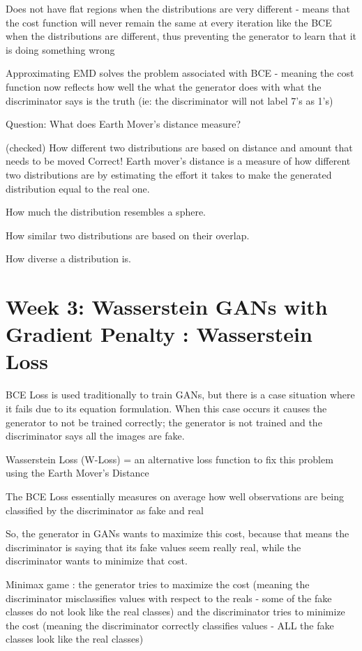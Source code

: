 \documentclass[11pt, onecolumn]{article}
\begin{document}
Does not have flat regions when the distributions are very different - means that the cost function will never remain the same at every iteration like the BCE when the distributions are different, thus preventing the generator to learn that it is doing something wrong

Approximating EMD solves the problem associated with BCE - meaning the cost function now reflects how well the what the generator does with what the discriminator says is the truth (ie: the discriminator will not label 7's as 1's) 

Question: 
What does Earth Mover's distance measure?

(checked) How different two distributions are based on distance and amount that needs to be moved
Correct! Earth mover's distance is a measure of how different two distributions are by estimating the effort it takes to make the generated distribution equal to the real one.

How much the distribution resembles a sphere.

How similar two distributions are based on their overlap.

How diverse a distribution is.

\section{Week 3: Wasserstein GANs with Gradient Penalty : Wasserstein Loss}

BCE Loss is used traditionally to train GANs, but there is a case situation where it fails due to its equation formulation. When this case occurs it causes the generator to not be trained correctly; the generator is not trained and the discriminator says all the images are fake.

Wasserstein Loss (W-Loss) = an alternative loss function to fix this problem using the Earth Mover's Distance

The BCE Loss essentially measures on average how well observations are being classified by the discriminator as fake and real

So, the generator in GANs wants to maximize this cost, because that means the discriminator is saying that its fake values seem really real, while the discriminator wants to minimize that cost.

Minimax game : the generator tries to maximize the cost (meaning the discriminator misclassifies values with respect to the reals - some of the fake classes do not look like the real classes) and the discriminator tries to minimize the cost (meaning the discriminator correctly classifies values - ALL the fake classes look like the real classes)
\end{document}
